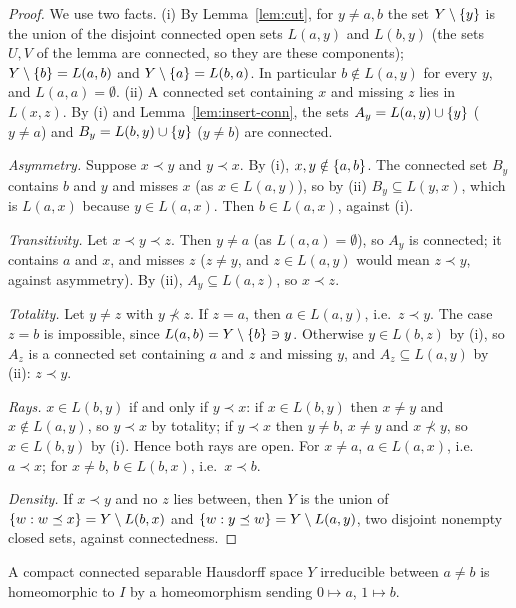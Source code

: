 \begin{proof}
We use two facts. (i) By Lemma~\ref{lem:cut}, for $y\ne a,b$ the set $Y\setminus\left\{ y \right\}$ is the
union of the disjoint connected open sets $L(a,y)$ and $L(b,y)$ (the sets $U,V$ of the lemma are
connected, so they are these components); $Y\setminus\left\{ b \right\}=L(a,b)$ and $Y\setminus\left\{ a \right\}=L(b,a)$.
In particular $b\notin L(a,y)$ for every $y$, and $L(a,a)=\emptyset$. (ii) A connected set
containing $x$ and missing $z$ lies in $L(x,z)$. By (i) and Lemma~\ref{lem:insert-conn}, the sets
$A_y=L(a,y)\cup\left\{ y \right\}$ ($y\ne a$) and $B_y=L(b,y)\cup\left\{ y \right\}$ ($y\ne b$) are connected.

\emph{Asymmetry.} Suppose $x\prec y$ and $y\prec x$. By (i), $x,y\notin\left\{ a,b \right\}$. The connected set
$B_y$ contains $b$ and $y$ and misses $x$ (as $x\in L(a,y)$), so by (ii) $B_y\subseteq L(y,x)$,
which is $L(a,x)$ because $y\in L(a,x)$. Then $b\in L(a,x)$, against (i).

\emph{Transitivity.} Let $x\prec y\prec z$. Then $y\ne a$ (as $L(a,a)=\emptyset$), so $A_y$ is
connected; it contains $a$ and $x$, and misses $z$ ($z\ne y$, and $z\in L(a,y)$ would mean $z\prec
y$, against asymmetry). By (ii), $A_y\subseteq L(a,z)$, so $x\prec z$.

\emph{Totality.} Let $y\ne z$ with $y\not\prec z$. If $z=a$, then $a\in L(a,y)$, i.e.\ $z\prec y$.
The case $z=b$ is impossible, since $L(a,b)=Y\setminus\left\{ b \right\}\ni y$. Otherwise $y\in L(b,z)$ by (i),
so $A_z$ is a connected set containing $a$ and $z$ and missing $y$, and $A_z\subseteq L(a,y)$ by
(ii): $z\prec y$.

\emph{Rays.} $x\in L(b,y)$ if and only if $y\prec x$: if $x\in L(b,y)$ then $x\ne y$ and $x\notin
L(a,y)$, so $y\prec x$ by totality; if $y\prec x$ then $y\ne b$, $x\ne y$ and $x\not\prec y$, so
$x\in L(b,y)$ by (i). Hence both rays are open. For $x\ne a$, $a\in L(a,x)$, i.e.\ $a\prec x$; for
$x\ne b$, $b\in L(b,x)$, i.e.\ $x\prec b$.

\emph{Density.} If $x\prec y$ and no $z$ lies between, then $Y$ is the union of
$\left\{ w:w\preceq x \right\}=Y\setminus L(b,x)$ and $\left\{ w:y\preceq w \right\}=Y\setminus L(a,y)$, two disjoint
nonempty closed sets, against connectedness.
\end{proof}


\begin{theorem}\label{thm:irr-arc}
A compact connected separable Hausdorff space $Y$ irreducible between $a\ne b$ is homeomorphic to
$I$ by a homeomorphism sending $0\mapsto a$, $1\mapsto b$.
\end{theorem}

